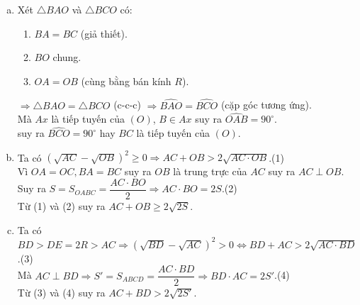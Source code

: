\begin{bt}
{\begin{center}
		\end{center}
		\begin{enumerate}[a)]
			\item Xét $\triangle BAO$ và $\triangle BCO$ có:
			\begin{enumerate}[]
				\item $BA = BC$ (giả thiết).
				\item $BO$ chung.
				\item $OA = OB$ (cùng bằng bán kính $R$).
			\end{enumerate}
			
			$\Rightarrow \triangle BAO = \triangle BCO$ (c-c-c)  $\Rightarrow \widehat{BAO} = \widehat{BCO}$ (cặp góc tương ứng).\\
			Mà $Ax$ là tiếp tuyến của $(O)$, $B\in Ax$ suy ra $\widehat{OAB} = 90^\circ$.\\
			suy ra $\widehat{BCO} = 90^\circ$ hay $BC$ là tiếp tuyến của $(O)$.
			\item Ta có $(\sqrt{AC}-\sqrt{OB})^2 \geq  0\Rightarrow AC + OB > 2\sqrt{AC\cdot OB}$.\hfill (1)\\
			Vì $OA = OC, BA = BC$ suy ra $OB$ là trung trực của $AC$ suy ra $AC \perp OB$.\\
			Suy ra $S= S_{OABC} = \dfrac{AC\cdot BO}{2}\Rightarrow AC\cdot BO = 2S$.\hfill (2)\\
			Từ (1) và (2) suy ra $AC + OB \geq 2\sqrt{2S}. $
			\item Ta có $BD > DE = 2R > AC \Rightarrow (\sqrt{BD}-\sqrt{AC})^2 > 0 \Leftrightarrow BD+AC > 2\sqrt{AC\cdot BD}$.\hfill (3)\\
			Mà $AC \perp BD \Rightarrow S' = S_{ABCD} = \dfrac{AC\cdot BD}{2}\Rightarrow  BD\cdot AC = 2S'$.\hfill (4)\\
			Từ (3) và (4) suy ra $AC+BD > 2\sqrt{2S'}$.
			

\end{enumerate}}
\end{bt}
